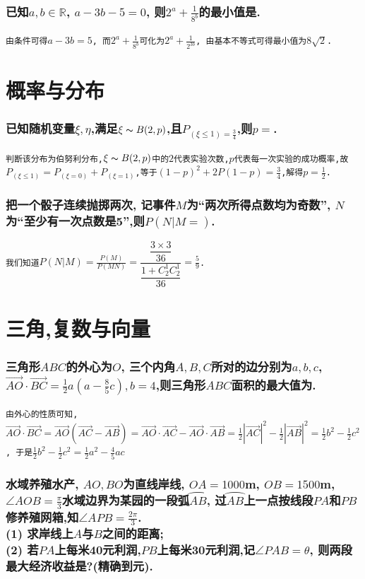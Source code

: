 \documentclass{article}
\newcommand{\1}{\underline{\makebox[1cm]{}}}
\newcommand{\2}{\underline{\makebox[2cm]{}}}
\newcommand{\3}{\underline{\makebox[3cm]{}}}
\newcommand{\4}{\underline{\makebox[4cm]{}}}
\newcommand{\lge}{\large \texttt}
\newcommand{\xl}{\overrightarrow}
\newlength{\la}
\begin{document}
\section{已知$a, b \in \mathbb{R}$, $a - 3b - 5 = 0$, 则$2^a + \frac{1}{8^b}$的最小值是\2.}
\lge{由条件可得$a - 3b = 5$, 而$2^a + \frac{1}{8^b}$可化为$2^a + \frac{1}{2^{3b}}$, 由基本不等式可得最小值为$8\sqrt{2}$.}


\newpage

\part{概率与分布}

\section{已知随机变量$\xi, \eta $,满足$\xi \thicksim B(2, p)$,且$P_{(\xi \leq 1) = \frac{3}{4}}$,则$p = $\2.}
\lge{判断该分布为伯努利分布,$\xi \thicksim B(2, p)$中的$2$代表实验次数,$p$代表每一次实验的成功概率,故$P_{(\xi \leq 1)} = P_{(\xi = 0)} + P_{(\xi = 1)}$,等于$(1 - p)^2 + 2P(1 - p) = \frac{3}{4}$,解得$p = \frac{1}{2}$.}

\section{把一个骰子连续抛掷两次, 记事件$M$为``两次所得点数均为奇数'', $N$为``至少有一次点数是5'',则$P(N | M = )$\2.}
\lge{我们知道$P(N|M) = \frac{P(M)}{P(MN)} = \dfrac{\dfrac{3 \times 3}{36}}{\dfrac{1 + C_2^1C_2^1}{36}} = \frac{5}{9}$.}


\part{三角,复数与向量}

\section{三角形$ABC$的外心为$O$, 三个内角$A, B, C$所对的边分别为$a, b, c$, $ \xl{AO} \cdot \xl{BC} = \frac{1}{2}a(a-\frac{8}{5}c), b = 4$,则三角形$ABC$面积的最大值为\2.}
\lge{由外心的性质可知, $\xl{AO} \cdot \xl{BC} = \xl{AO}(\xl{AC}-\xl{AB}) = \xl{AO} \cdot \xl{AC} - \xl{AO} \cdot \xl{AB} = \frac{1}{2}|\xl{AC}|^2 - \frac{1}{2}|\xl{AB}|^2 = \frac{1}{2}b^2 - \frac{1}{2}c^2$, 于是$
\frac{1}{2}b^2 - \frac{1}{2}c^2 = \frac{1}{2}a^2 - \frac{4}{5}ac$}

\section{水域养殖水产, $AO, BO$为直线岸线, $OA = 1000$m, $OB = 1500$m, $\angle{AOB} = \frac{\pi}{3}$水域边界为某园的一段弧$\wideparen{AB}$, 过$\wideparen{AB}$上一点按线段$PA$和$PB$修养殖网箱,知$\angle{APB} = \frac{2\pi}{3}$.
\\(1) 求岸线上$A$与$B$之间的距离;
\\(2) 若$PA$上每米40元利润,$PB$上每米30元利润,记$\angle{PAB} = \theta$, 则两段最大经济收益是?(精确到元).
}
\end{document}
